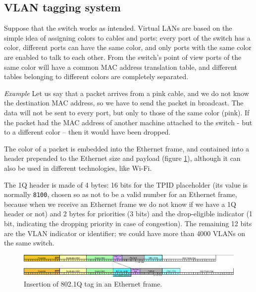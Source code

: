\subsection{VLAN tagging system}
Suppose that the switch works as intended. Virtual LANs are based on the simple idea of assigning colors to cables and ports: every port of the switch has a color, different ports can have the same color, and only ports with the same color are enabled to talk to each other. From the switch's point of view ports of the same color will have a common MAC address translation table, and different tables belonging to different colors are completely separated.

\vspace{0.5em}

\emph{Example} Let us say that a packet arrives from a pink cable, and we do not know the destination MAC address, so we have to send the packet in broadcast. The data will not be sent to every port, but only to those of the same color (pink). If the packet had the MAC address of another machine attached to the switch - but to a different color – then it would have been dropped.

\vspace{0.5em}

The color of a packet is embedded into the Ethernet frame, and contained into a header prepended to the Ethernet size and payload (figure \ref{fig:vlan_tag}), although it can also be used in different technologies, like Wi-Fi.

The 1Q header is made of 4 bytes: 16 bits for the TPID placeholder (its value is normally \texttt{8100}, chosen so as not to be a valid number for an Ethernet frame, because when we receive an Ethernet frame we do not know if we have a 1Q header or not) and 2 bytes for priorities (3 bits) and the drop-eligible indicator (1 bit, indicating the dropping priority in case of congestion). The remaining 12 bits are the VLAN indicator or identifier; we could have more than 4000 VLANs on the same switch.

\begin{figure}[h]
    \centering
    \includegraphics[scale=0.25]{img/vlan_tag.png}
    \decoRule
    \caption{Insertion of 802.1Q tag in an Ethernet frame.}
    \label{fig:vlan_tag}
\end{figure}
 
